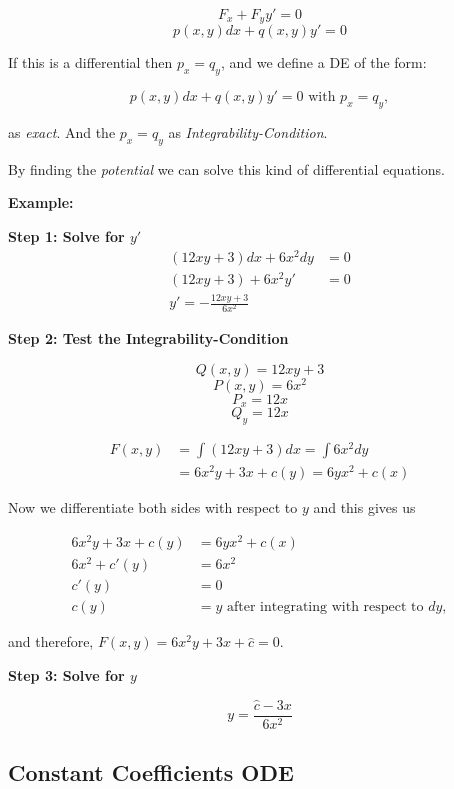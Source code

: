 \[
F_x + F_y y' = 0
\]
\[
p(x,y)dx + q(x,y)y' = 0
\]

If this is a differential then \(p_x = q_y\), and we define a DE of the form:

\[
p(x,y)dx + q(x,y)y' = 0 \text{ with } p_x = q_y,
\]

as \emph{exact}. And the \(p_x = q_y\) as \emph{Integrability-Condition}.
\vspace{\baselineskip}

By finding the \emph{potential} we can solve this kind of differential equations.
\vspace{\baselineskip}

\textbf{Example:}
\vspace{\baselineskip}

\textbf{Step 1: Solve for \(y'\)}
\begin{align*}
    (12xy + 3)dx + 6x^2dy &= 0\\
    (12xy + 3) + 6x^2 y' &= 0\\
    y' = - \frac{12xy + 3}{6x^2}
\end{align*}

\textbf{Step 2: Test the Integrability-Condition}

\[Q(x,y) = 12xy + 3\]
\[P(x,y) = 6x^2\] 
\[P_x = 12x\]
\[Q_y = 12x\]

\begin{align*}
F(x,y) &= \int (12xy + 3)dx = \int 6x^2 dy\\
       &= 6x^2 y + 3x + c(y) = 6yx^2 + c(x)
\end{align*}

Now we differentiate both sides with respect to \(y\) and this gives us

\begin{align*}
    6x^2y + 3x + c(y) &= 6yx^2 + c(x) \\
    6x^2 + c'(y) &= 6x^2 \\
           c'(y) &= 0 \\
            c(y) &= y \text{ after integrating with respect to } dy,
\end{align*}

and therefore, \(F(x,y) = 6x^2y + 3x + \hat{c} = 0\).
\vspace{\baselineskip}

\textbf{Step 3: Solve for \(y\)}

\[y = \frac{\hat{c} - 3x}{6x^2} \]

\subsection{Constant Coefficients ODE}

